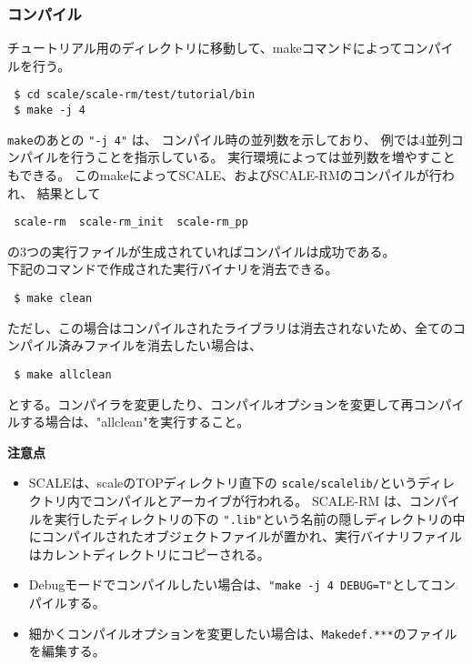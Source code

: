 \subsubsection{コンパイル}

チュートリアル用のディレクトリに移動して、makeコマンドによってコンパイルを行う。
\begin{verbatim}
 $ cd scale/scale-rm/test/tutorial/bin
 $ make -j 4
\end{verbatim}
\verb|make|のあとの \verb|"-j 4"| は、
コンパイル時の並列数を示しており、
例では4並列コンパイルを行うことを指示している。
実行環境によっては並列数を増やすこともできる。
このmakeによってSCALE、およびSCALE-RMのコンパイルが行われ、
結果として
\begin{verbatim}
 scale-rm  scale-rm_init  scale-rm_pp
\end{verbatim}
の3つの実行ファイルが生成されていればコンパイルは成功である。\\

下記のコマンドで作成された実行バイナリを消去できる。
\begin{verbatim}
 $ make clean
\end{verbatim}
ただし、この場合はコンパイルされたライブラリは消去されないため、全てのコンパイル済みファイルを消去したい場合は、
\begin{verbatim}
 $ make allclean
\end{verbatim}
とする。コンパイラを変更したり、コンパイルオプションを変更して再コンパイルする場合は、"allclean"を実行すること。


{\bf 注意点}
\begin{itemize}
\item SCALEは、scaleのTOPディレクトリ直下の
 \verb|scale/scalelib/|というディレクトリ内でコンパイルとアーカイブが行われる。
 SCALE-RM は、コンパイルを実行したディレクトリの下の
 \verb|".lib"|という名前の隠しディレクトリの中にコンパイルされたオブジェクトファイルが置かれ、実行バイナリファイルはカレントディレクトリにコピーされる。
\item Debugモードでコンパイルしたい場合は、\verb|"make -j 4 DEBUG=T"|としてコンパイルする。
\item 細かくコンパイルオプションを変更したい場合は、\verb|Makedef.***|のファイルを編集する。
\end{itemize}



